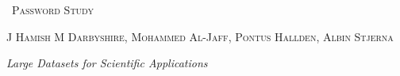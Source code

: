 \begin{titlepage}
	\centering
	\vspace{3cm}
	{\scshape\Huge\ Password Study \par}
	\vspace{3cm}
	{\scshape\Large J Hamish M Darbyshire, Mohammed Al-Jaff, Pontus Hallden, Albin Stjerna\par}

	\vfill
	{\Large\itshape Large Datasets for Scientific Applications}
\end{titlepage}